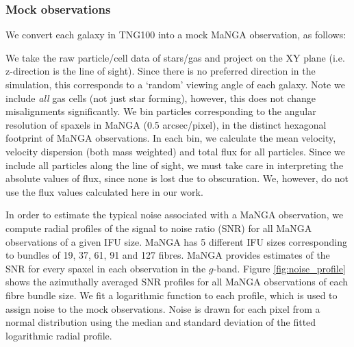 \subsubsection{Mock observations} \label{sec:mock_obs}
We convert each galaxy in TNG100 into a mock MaNGA observation, as follows:

We take the raw particle/cell data of stars/gas and project on the XY plane (i.e. z-direction is the line of sight). Since there is no preferred direction in the simulation, this corresponds to a `random' viewing angle of each galaxy. Note we include \textit{all} gas cells (not just star forming), however, this does not change misalignments significantly. We bin particles corresponding to the angular resolution of spaxels in MaNGA (0.5 arcsec/pixel), in the distinct hexagonal footprint of MaNGA observations. In each bin, we calculate the mean velocity, velocity dispersion (both mass weighted) and total flux for all particles. Since we include all particles along the line of sight, we must take care in interpreting the absolute values of flux, since none is lost due to obscuration. We, however, do not use the flux values calculated here in our work. 

In order to estimate the typical noise associated with a MaNGA observation, we compute radial profiles of the signal to noise ratio (SNR) for all MaNGA observations of a given IFU size. MaNGA has 5 different IFU sizes corresponding to bundles of 19, 37, 61, 91 and 127 fibres. MaNGA provides estimates of the SNR for every spaxel in each observation in the $g$-band. Figure \ref{fig:noise_profile} shows the azimuthally averaged SNR profiles for all MaNGA observations of each fibre bundle size. We fit a logarithmic function to each profile, which is used to assign noise to the mock observations. Noise is drawn for each pixel from a normal distribution using the median and standard deviation of the fitted logarithmic radial profile.

